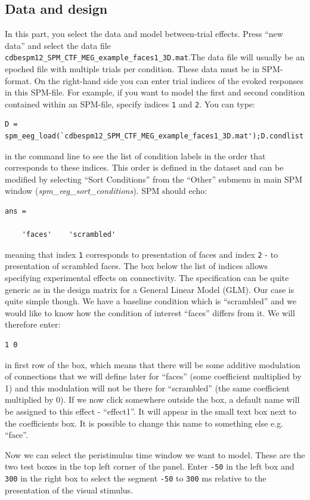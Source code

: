 \subsection{Data and design}
In this part, you select the data and model between-trial effects. Press ``new data'' and select the data file \texttt{cdbespm12\_\-SPM\_\-CTF\_\-MEG\_\-example\_\-faces1\_\-3D.mat}.The data file will usually be an epoched file with multiple trials per condition. These data must be in SPM-format. On the right-hand side you can enter trial indices of the evoked responses in this SPM-file. For example, if you want to model the first and second condition contained within an SPM-file, specify
indices \texttt{1} and \texttt{2}. You can type:
\begin{verbatim}
D = spm_eeg_load(`cdbespm12_SPM_CTF_MEG_example_faces1_3D.mat');D.condlist
\end{verbatim}
in the command line to see the list of condition labels in the order that corresponds to these indices. This order is defined in the dataset and can be modified by selecting ``Sort Conditions'' from the ``Other'' submenu in main SPM window (\textit{spm\_eeg\_sort\_conditions}). SPM should echo:
\begin{verbatim}
ans = 

    'faces'    'scrambled'
\end{verbatim}
meaning that index \texttt{1} corresponds to presentation of faces and index \texttt{2} - to presentation of scrambled faces. The box below the list of indices allows specifying experimental effects on connectivity. The specification can be quite generic as in the design matrix for a General Linear Model (GLM). Our case is quite simple though. We have a baseline condition which is ``scrambled'' and we would like to know how the condition of interest ``faces'' differs from it. We will therefore enter:
\begin{verbatim}
1 0
\end{verbatim}
in first row of the box, which means that there will be some additive modulation of connections that we will define later for ``faces''  (some coefficient multiplied by 1) and this modulation will not be there for ``scrambled'' (the same coefficient multiplied by 0). If we now click somewhere outside the box, a default name will be assigned to this effect - ``effect1''. It will appear in the small text box next to the coefficients box. It is possible to change this name to something else e.g. ``face''.

Now we can select the peristimulus time window we want to model. These are the two test boxes in the top left corner of the panel. Enter \texttt{-50} in the left box and \texttt{300} in the right box to select the segment \texttt{-50} to \texttt{300} ms relative to the presentation of the visual stimulus.  

